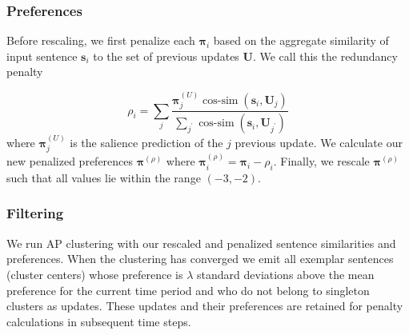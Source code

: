 \subsubsection{Preferences}

Before rescaling, we first penalize each $\boldsymbol{\pi}_i$ based on
the aggregate similarity of input sentence $\mathbf{s}_i$ to the set of previous updates
$\mathbf{U}$. We call this the redundancy penalty 

$$\rho_i = \sum_j \frac{\boldsymbol{\pi}^{(U)}_{j}\operatorname{cos-sim}(\mathbf{s}_i, \mathbf{U}_j)}
{\sum_{j^\prime}\operatorname{cos-sim}(\mathbf{s}_i, \mathbf{U}_{j^\prime})} $$   
where $\boldsymbol{\pi}^{(U)}_{j}$ is the salience prediction of the $j$ 
previous update. We calculate our new penalized preferences 
$\boldsymbol{\pi}^{(\rho)}$ where $\boldsymbol{\pi}^{(\rho)}_i = \boldsymbol{\pi}_i - \rho_i$.
Finally, we rescale $\boldsymbol{\pi}^{(\rho)}$ such that all values lie 
within the range $(-3,-2)$.

\subsubsection{Filtering}

We run AP clustering with our rescaled and penalized sentence similarities
and preferences. When the clustering has converged we emit all exemplar
sentences (cluster centers) whose preference is $\lambda$ standard deviations
above the mean preference for the current time period and who do not belong
to singleton clusters as updates. These updates and their preferences are 
retained for penalty calculations in subsequent time steps.


